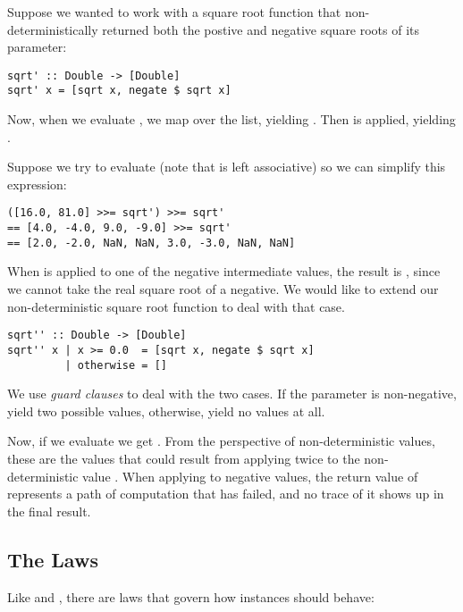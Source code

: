 Suppose we wanted to work with a square root function that non-deterministically returned both the postive and negative
square roots of its parameter:

\begin{lstlisting}
sqrt' :: Double -> [Double]
sqrt' x = [sqrt x, negate $ sqrt x]
\end{lstlisting}

Now, when we evaluate , we map  over the list, yielding \code{[[2.0, -2.0], [3.0, -3.0]]}. 
Then  is applied, yielding \code{[2.0, -2.0, 3.0, -3.0]}.

Suppose we try to evaluate  (note that \code{(>>=)} is left associative) so we can simplify
this expression:

\begin{lstlisting}
([16.0, 81.0] >>= sqrt') >>= sqrt' 
== [4.0, -4.0, 9.0, -9.0] >>= sqrt'
== [2.0, -2.0, NaN, NaN, 3.0, -3.0, NaN, NaN]
\end{lstlisting}

When  is applied to one of the negative intermediate values, the result is , since we cannot take the
real square root of a negative. We would like to extend our non-deterministic square root function to deal with that case.

\begin{lstlisting}
sqrt'' :: Double -> [Double]
sqrt'' x | x >= 0.0  = [sqrt x, negate $ sqrt x]
         | otherwise = []
\end{lstlisting}
 
We use \textit{guard clauses} to deal with the two cases. If the parameter is non-negative, yield two possible values, otherwise,
yield no values at all. 

Now, if we evaluate  we get \code{[2.0, -2.0, 3.0, -3.0]}. From the perspective of non-deterministic
values, these are the values that could result from applying  twice to the non-deterministic value \code{[16.0, 81.0]}.
When applying  to negative values, the return value of \code{[]} represents a path of computation that has failed, and no
trace of it shows up in the final result.

\subsection{The  Laws}

Like  and , there are laws that govern how  instances should behave:


